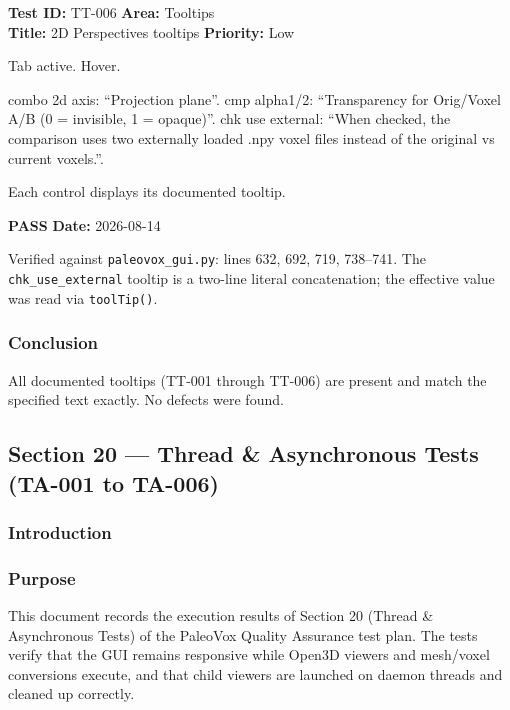 \documentclass[12pt,a4paper]{article}
\newcommand{\pass}{\textcolor{paleogreen}{\textbf{PASS}}}
\newcommand{\testheader}[4]{%
  \smallskip
  \noindent\textbf{Test ID:} #1 \hfill \textbf{Area:} #2 \\
  \textbf{Title:} #3 \hfill \textbf{Priority:} #4
}
\newenvironment{testbody}{%
  \begin{description}[leftmargin=2em,style=nextline]
}{%
  \end{description}
  \smallskip
}
\begin{document}
\testheader{TT-006}{Tooltips}{2D Perspectives tooltips}{Low}
\begin{testbody}
  \item[\textbf{Preconditions:}] Tab active. Hover.
  \item[\textbf{Steps:}] combo 2d axis: ``Projection plane''. cmp alpha1/2:
        ``Transparency for Orig/Voxel A/B (0 = invisible, 1 = opaque)''.
        chk use external: ``When checked, the comparison uses two externally
        loaded .npy voxel files instead of the original vs current voxels.''.
  \item[\textbf{Expected Result:}] Each control displays its documented
        tooltip.
  \item[\textbf{Status:}] \pass{} \hspace{1em} \textbf{Date:} 2026-08-14
  \item[\textbf{Notes:}] Verified against \texttt{paleovox\_gui.py}: lines 632,
        692, 719, 738--741. The \texttt{chk\_use\_external} tooltip is a
        two-line literal concatenation; the effective value was read via
        \texttt{toolTip()}.
\end{testbody}

\subsubsection{Conclusion}

All documented tooltips (TT-001 through TT-006) are present and match the
specified text exactly. No defects were found.

\newpage

\subsection{Section 20 --- Thread \& Asynchronous Tests (TA-001 to TA-006)}

\subsubsection{Introduction}

\subsubsection{Purpose}
This document records the execution results of Section 20 (Thread \&
Asynchronous Tests) of the PaleoVox Quality Assurance test plan. The tests
verify that the GUI remains responsive while Open3D viewers and mesh/voxel
conversions execute, and that child viewers are launched on daemon threads and
cleaned up correctly.
\end{document}
